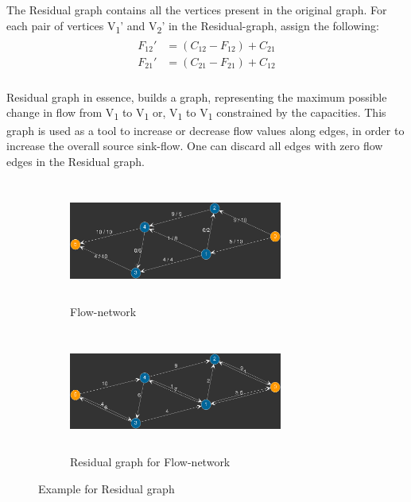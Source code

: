 \documentclass[paper=a4, fontsize=11pt]{scrartcl} %
\numberwithin{equation}{section} %
\numberwithin{figure}{section} %
\numberwithin{table}{section} %
\begin{document}
The Residual graph contains all the vertices present in the original graph. For each pair of vertices V\textsubscript{1}' and V\textsubscript{2}' in the Residual-graph, assign the following:
\begin{align} 
\begin{split}
F_{12}' &= (C_{12} - F_{12} ) + C_{21}\\
F_{21}' &= (C_{21} - F_{21} ) + C_{12}\\
\end{split}					
\end{align}

Residual graph in essence, builds a graph, representing the maximum possible change in flow from V\textsubscript{1} to V\textsubscript{1} or, V\textsubscript{1} to V\textsubscript{1} constrained by the capacities. This graph is used as a tool to increase or decrease flow values along edges, in order to increase the overall source sink-flow. One can discard all edges with zero flow edges in the Residual graph.

\begin{figure}[h]
\begin{subfigure}{0.5\textwidth}
\includegraphics[width=7cm, height=4cm,center]{p6.png}
\caption{Flow-network}
\label{fig:subim1}
\end{subfigure}
\begin{subfigure}{0.5\textwidth}
\includegraphics[width=7cm, height=4cm,center]{p5.png}
\caption{Residual graph for Flow-network}
\label{fig:subim2}
\end{subfigure}

\caption{Example for Residual graph}
\label{fig:image2}
\end{figure}
\end{document}
